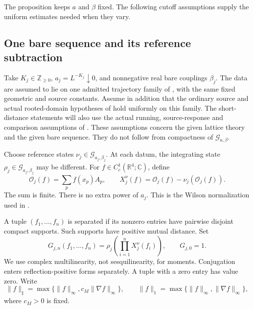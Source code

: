\documentclass[11pt,letterpaper,reqno]{amsart}
\numberwithin{equation}{section}
\theoremstyle{definition}
\theoremstyle{remark}
\begin{document}
The proposition keeps \(a\) and \(\beta\) fixed. The following
cutoff assumptions supply the uniform estimates needed when
they vary.

\subsection{One bare sequence and its reference subtraction}

Take \(K_j\in\mathbb Z_{\ge0}\), \(a_j=L^{-K_j}\downarrow0\),
and nonnegative real bare couplings
\(\beta_j\). The data are assumed to lie on one admitted
trajectory family of \cite[Theorem~A]{RT}, with the same
fixed geometric and source constants. Assume in addition that the
ordinary source and actual rooted-domain hypotheses of
\cite[Theorems~B and C]{SI} hold uniformly on this family.
The short-distance statements will also use the actual
running, source-response and comparison assumptions of
\cite[Theorem~A and its cofinal alternative]{FP}. These
assumptions concern the given lattice theory and the
given bare sequence. They do not follow from compactness
of \(\mathcal G_{a,\beta}\).

Choose reference states \(\nu_j\in\mathcal G_{a_j,\beta_j}\).
At each datum, the integrating state
\(\rho_j\in\mathcal G_{a_j,\beta_j}\) may be different.
For \(f\in C_c^1(\mathbb R^4;\mathbb C)\), define
\begin{equation}\label{cl:eq-observable}
 \mathcal O_j(f)=\sum_p f(x_p)A_p,\qquad
 X_j^\nu(f)=\mathcal O_j(f)-\nu_j(\mathcal O_j(f)).
\end{equation}
The sum is finite. There is no extra power of \(a_j\).
This is the Wilson normalization used in \cite{SI,FP}.

A tuple \((f_1,\ldots,f_n)\) is separated if its nonzero
entries have pairwise disjoint compact supports. Such
supports have positive mutual distance. Set
\begin{equation}\label{cl:eq-cutoff-moments}
 G_{j,n}(f_1,\ldots,f_n)
   =\rho_j\!\left(\prod_{i=1}^n X_j^\nu(f_i)\right),
 \qquad G_{j,0}=1.
\end{equation}
We use complex multilinearity, not sesquilinearity, for
moments. Conjugation enters reflection-positive forms
separately. A tuple with a zero entry has value zero.
Write
\begin{equation}\label{cl:eq-sharp}
 \|f\|_\sharp=\max\{\|f\|_\infty,c_M\|\nabla f\|_\infty\},
 \qquad
 \|f\|_1=\max\{\|f\|_\infty,\|\nabla f\|_\infty\},
\end{equation}
where \(c_M>0\) is fixed.
\end{document}
